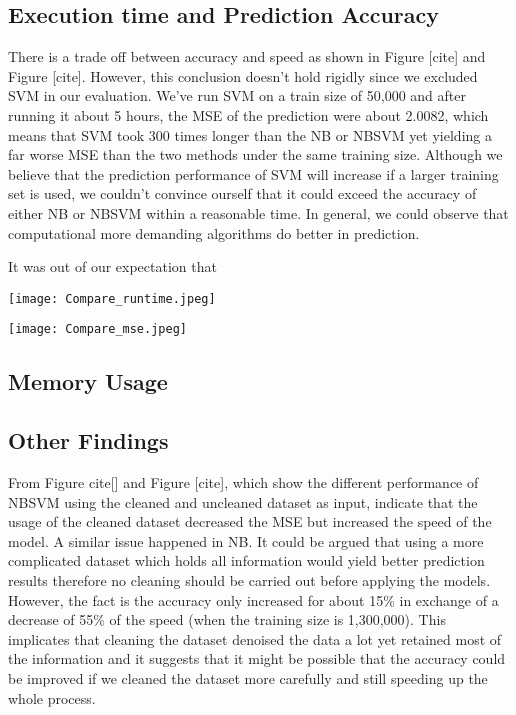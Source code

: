 \documentclass[letterpaper]{article} %
\begin{document}
\subsection{Execution time and Prediction Accuracy}
There is a trade off between accuracy and speed as shown in Figure [cite] and Figure [cite]. However, this conclusion doesn't hold rigidly since we excluded SVM in our evaluation. We've run SVM on a train size of 50,000 and after running it about 5 hours, the MSE of the prediction were about 2.0082, which means that SVM took 300 times longer than the NB or NBSVM yet yielding a far worse MSE than the two methods under the same training size. Although we believe that the prediction performance of SVM will increase if a larger training set is used, we couldn't convince ourself that it could exceed the accuracy of either NB or NBSVM within a reasonable time. In general, we could observe that computational more demanding algorithms do better in prediction.

It was out of our expectation that 



\begin{center}
\centering
\texttt{[image: Compare\_runtime.jpeg]}
\end{center}

\begin{center}
\centering
\texttt{[image: Compare\_mse.jpeg]}
\end{center}


\subsection{Memory Usage}


\subsection{Other Findings}
From Figure cite[] and Figure [cite], which show the different performance of NBSVM using the cleaned and uncleaned dataset as input, indicate that the usage of the cleaned dataset decreased the MSE but increased the speed of the model. A similar issue happened in NB. It could be argued that using a more complicated dataset which holds all information would yield better prediction results therefore no cleaning should be carried out before applying the models. However, the fact is the accuracy only increased for about 15\% in exchange of a decrease of 55\% of the speed (when the training size is 1,300,000). This implicates that cleaning the dataset denoised the data a lot yet retained most of the information and it suggests that it might be possible that the accuracy could be improved if we cleaned the dataset more carefully and still speeding up the whole process. 
\end{document}
